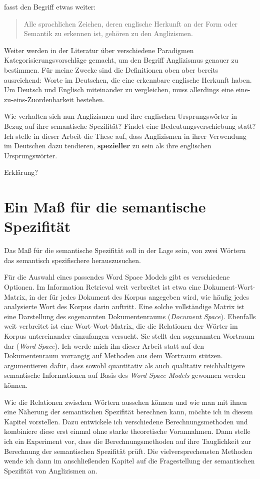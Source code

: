 \documentclass[11pt,numbers=noenddot]{scrartcl}
\begin{document}
\noindent \citet[S. 216]{burmasova2010empirische} fasst den Begriff etwas weiter:
\begin{quote}
    Alle sprachlichen Zeichen, deren englische Herkunft an der Form oder Semantik zu erkennen ist, gehören zu den Anglizismen.
\end{quote}

Weiter werden in der Literatur über verschiedene Paradigmen Kategorisierungsvorschläge gemacht, um den Begriff Anglizismus genauer zu bestimmen. Für meine Zwecke sind die Definitionen oben aber bereits ausreichend: Worte im Deutschen, die eine erkennbare englische Herkunft haben. Um Deutsch und Englisch miteinander zu vergleichen, muss allerdings eine eine-zu-eins-Zuordenbarkeit bestehen.

Wie verhalten sich nun Anglizismen und ihre englischen Ursprungswörter in Bezug auf ihre semantische Spezifität? Findet eine Bedeutungsverschiebung statt? Ich stelle in dieser Arbeit die These auf, dass Anglizismen in ihrer Verwendung im Deutschen dazu tendieren, \textbf{spezieller} zu sein als ihre englischen Ursprungswörter.

Erklärung?
\section{Ein Maß für die semantische Spezifität}

Das Maß für die semantische Spezifität soll in der Lage sein, von zwei Wörtern das semantisch spezifischere herauszusuchen.

Für die Auswahl eines passendes Word Space Models gibt es verschiedene Optionen. Im Information Retrieval weit verbreitet ist etwa eine Dokument-Wort-Matrix, in der für jedes Dokument des Korpus angegeben wird, wie häufig jedes analysierte Wort des Korpus darin auftritt. Eine solche vollständige Matrix ist eine Darstellung des sogenannten Dokumentenraums (\emph{Document Space})\citep[S.296]{manning1999}. Ebenfalls weit verbreitet ist eine Wort-Wort-Matrix, die die Relationen der Wörter im Korpus untereinander einzufangen versucht. Sie stellt den sogenannten Wortraum dar (\emph{Word Space}). Ich werde mich ihn dieser Arbeit statt auf den Dokumentenraum vorrangig auf Methoden aus dem Wortraum stützen. \citet{Schutze:1994:CTT:2856823.2856847} argumentieren dafür, dass sowohl quantitativ als auch qualitativ reichhaltigere semantische Informationen auf Basis des \emph{Word Space Models} gewonnen werden können.

Wie die Relationen zwischen Wörtern aussehen können und wie man mit ihnen eine Näherung der semantischen Spezifität berechnen kann, möchte ich in diesem Kapitel vorstellen. Dazu entwickele ich verschiedene Berechnungsmethoden und kombiniere diese erst einmal ohne starke theoretische Vorannahmen. Dann stelle ich ein Experiment vor, dass die Berechnungsmethoden auf ihre Tauglichkeit zur Berechnung der semantischen Spezifität prüft. Die vielversprechensten Methoden wende ich dann im anschließenden Kapitel auf die Fragestellung der semantischen Spezifität von Anglizismen an.
\end{document}
